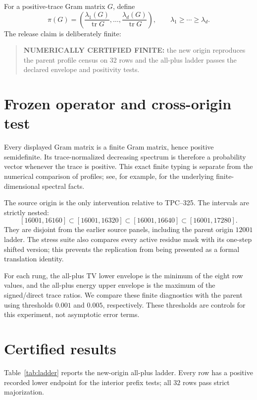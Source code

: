\documentclass[10pt]{article}
\begin{document}
For a positive-trace Gram matrix $G$, define
\[
 \pi(G)=\left(\frac{\lambda_1(G)}{\operatorname{tr}G},\ldots,
 \frac{\lambda_d(G)}{\operatorname{tr}G}\right),
 \qquad \lambda_1\geq\cdots\geq\lambda_d.
\]
The release claim is deliberately finite:
\begin{quote}
\textbf{NUMERICALLY CERTIFIED FINITE:} the new origin reproduces the
parent profile census on $32$ rows and the all-plus ladder passes the
declared envelope and positivity tests.
\end{quote}

\section{Frozen operator and cross-origin test}

Every displayed Gram matrix is a finite Gram matrix, hence positive
semidefinite.  Its trace-normalized decreasing spectrum is therefore a
probability vector whenever the trace is positive.  This exact finite typing
is separate from the numerical comparison of profiles; see, for example,
\cite{horn2013matrix} for the underlying finite-dimensional spectral facts.

The source origin is the only intervention relative to TPC--325.  The
intervals are strictly nested:
\[
[16001,16160]\subset[16001,16320]\subset[16001,16640]
\subset[16001,17280].
\]
They are disjoint from the earlier source panels, including the parent
origin $12001$ ladder.  The stress suite also compares every active residue
mask with its one-step shifted version; this prevents the replication from
being presented as a formal translation identity.

For each rung, the all-plus TV lower envelope is the minimum of the eight
row values, and the all-plus energy upper envelope is the maximum of the
signed/direct trace ratios.  We compare these finite diagnostics with the
parent using thresholds $0.001$ and $0.005$, respectively.  These thresholds
are controls for this experiment, not asymptotic error terms.

\section{Certified results}

Table~\ref{tab:ladder} reports the new-origin all-plus ladder.  Every row has
a positive recorded lower endpoint for the interior prefix tests; all $32$
rows pass strict majorization.
\end{document}
